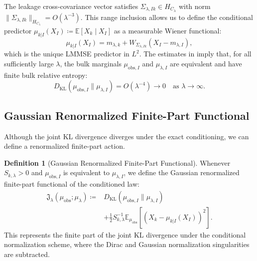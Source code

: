 \documentclass[11pt]{amsart}
\theoremstyle{plain}
\theoremstyle{definition}
\newtheorem{definition}[theorem]{Definition}
\theoremstyle{remark}
\newcommand{\KL}{D_{\operatorname{KL}}}
\newcommand{\E}{\mathbb{E}}
\begin{document}
The leakage cross-covariance vector satisfies $\Sigma_{\lambda,Ik} \in H_{C_\lambda}$ with norm $\|\Sigma_{\lambda,Ik}\|_{H_{C_\lambda}} = O(\lambda^{-3})$. This range inclusion allows us to define the conditional predictor $\mu_{k|I}(X_I) \coloneqq \E[X_k \mid X_I]$ as a measurable Wiener functional:
\begin{equation}
  \mu_{k|I}(X_I) = m_{\lambda,k} + W_{\Sigma_{\lambda,Ik}}(X_I - m_{\lambda,I}),
\end{equation}
which is the unique LMMSE predictor in $L^2$. The estimates in  imply that, for all sufficiently large $\lambda$, the bulk marginals $\mu_{\text{obs},I}$ and $\mu_{\lambda,I}$ are equivalent and have finite bulk relative entropy:
\begin{equation}
  \KL(\mu_{\text{obs},I} \parallel \mu_{\lambda,I}) = O(\lambda^{-4}) \to 0 \quad \text{as } \lambda \to \infty.
\end{equation}

\subsection{Gaussian Renormalized Finite-Part Functional}
\label{sec:gaussian:functional}

Although the joint KL divergence diverges under the exact conditioning, we can define a renormalized finite-part action.

\begin{definition}[Gaussian Renormalized Finite-Part Functional]
  \label{def:unified_action}
  Whenever $S_{k,\lambda}>0$ and $\mu_{\text{obs},I}$ is equivalent to $\mu_{\lambda,I}$, we define the Gaussian renormalized finite-part functional of the conditioned law:
  \begin{equation}
    \label{eq:unified_action}
    \begin{aligned}
      \mathfrak{J}_\lambda(\mu_{\mathrm{obs}}; \mu_\lambda) \coloneqq &\KL(\mu_{\mathrm{obs},I} \parallel \mu_{\lambda,I}) \\
      &+ \frac{1}{2} S_{k,\lambda}^{-1} \E_{\mu_{\mathrm{obs}}}\left[ \left( X_k - \mu_{k|I}(X_I) \right)^2 \right].
    \end{aligned}
  \end{equation}
  This represents the finite part of the joint KL divergence under the conditional normalization scheme, where the Dirac and Gaussian normalization singularities are subtracted.
\end{definition}
\end{document}
